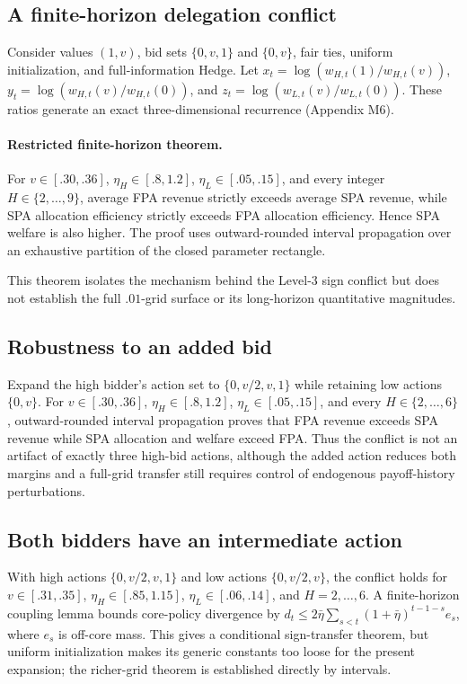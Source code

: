 \subsection{A finite-horizon delegation conflict}
Consider values $(1,v)$, bid sets $\{0,v,1\}$ and $\{0,v\}$, fair ties, uniform initialization, and full-information Hedge. Let $x_t=\log(w_{H,t}(1)/w_{H,t}(v))$, $y_t=\log(w_{H,t}(v)/w_{H,t}(0))$, and $z_t=\log(w_{L,t}(v)/w_{L,t}(0))$. These ratios generate an exact three-dimensional recurrence (Appendix M6).

\paragraph{Restricted finite-horizon theorem.} For $v\in[.30,.36]$, $\eta_H\in[.8,1.2]$, $\eta_L\in[.05,.15]$, and every integer $H\in\{2,\ldots,9\}$, average FPA revenue strictly exceeds average SPA revenue, while SPA allocation efficiency strictly exceeds FPA allocation efficiency. Hence SPA welfare is also higher. The proof uses outward-rounded interval propagation over an exhaustive partition of the closed parameter rectangle.

This theorem isolates the mechanism behind the Level-3 sign conflict but does not establish the full $.01$-grid surface or its long-horizon quantitative magnitudes.

\subsection{Robustness to an added bid}
Expand the high bidder's action set to $\{0,v/2,v,1\}$ while retaining low actions $\{0,v\}$. For $v\in[.30,.36]$, $\eta_H\in[.8,1.2]$, $\eta_L\in[.05,.15]$, and every $H\in\{2,\ldots,6\}$, outward-rounded interval propagation proves that FPA revenue exceeds SPA revenue while SPA allocation and welfare exceed FPA. Thus the conflict is not an artifact of exactly three high-bid actions, although the added action reduces both margins and a full-grid transfer still requires control of endogenous payoff-history perturbations.

\subsection{Both bidders have an intermediate action}
With high actions $\{0,v/2,v,1\}$ and low actions $\{0,v/2,v\}$, the conflict holds for $v\in[.31,.35]$, $\eta_H\in[.85,1.15]$, $\eta_L\in[.06,.14]$, and $H=2,\ldots,6$. A finite-horizon coupling lemma bounds core-policy divergence by $d_t\le2\bar\eta\sum_{s<t}(1+\bar\eta)^{t-1-s}e_s$, where $e_s$ is off-core mass. This gives a conditional sign-transfer theorem, but uniform initialization makes its generic constants too loose for the present expansion; the richer-grid theorem is established directly by intervals.
